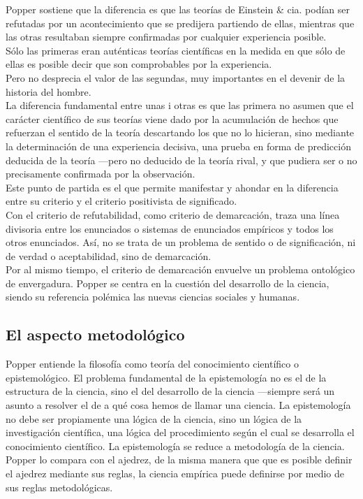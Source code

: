 \documentclass[a4paper, 11pt, twocolumn, spanish]{article}
\begin{document}
Popper sostiene que la diferencia es que las teorías de Einstein \&
cia. podían ser refutadas por un acontecimiento que se predijera
partiendo de ellas, mientras que las otras resultaban siempre
confirmadas por cualquier experiencia posible.\\[0pt]
Sólo las primeras eran auténticas teorías científicas en la medida en
que sólo de ellas es posible decir que son comprobables por la
experiencia.\\[0pt]
Pero no desprecia el valor de las segundas, muy importantes en el
devenir de la historia del hombre.\\[0pt]


La diferencia fundamental entre unas i otras es que las primera no
asumen que el carácter científico de sus teorías viene dado por la
acumulación de hechos que refuerzan el sentido de la teoría
descartando los que no lo hicieran, sino mediante la determinación de
una experiencia decisiva, una prueba en forma de predicción deducida
de la teoría —pero no deducido de la teoría rival, y que pudiera ser o
no precisamente confirmada por la observación.\\[0pt]

Este punto de partida es el que permite manifestar y ahondar en la
diferencia entre su criterio y el criterio positivista de
significado.\\[0pt]
Con el criterio de refutabilidad, como criterio de demarcación, traza
una línea divisoria entre los enunciados o sistemas de enunciados
empíricos y todos los otros enunciados. Así, no se trata de un
problema de sentido o de significación, ni de verdad o aceptabilidad,
sino de demarcación.\\[0pt]

Por al mismo tiempo, el criterio de demarcación envuelve un problema
ontológico de envergadura. Popper se centra en la cuestión del
desarrollo de la ciencia, siendo su referencia polémica las nuevas
ciencias sociales y humanas.

\subsection{El aspecto metodológico}
\label{sec:org549add2}
Popper entiende la filosofía como teoría del conocimiento científico o
epistemológico. El problema fundamental de la epistemología no es el
de la estructura de la ciencia, sino el del desarrollo de la ciencia
—siempre será un asunto a resolver el de a qué cosa hemos de llamar
una ciencia. La epistemología no debe ser propiamente una lógica de la
ciencia, sino un lógica de la investigación científica, una lógica del
procedimiento según el cual se desarrolla el conocimiento
científico. La epistemología se reduce a metodología de la ciencia.\\[0pt]
Popper lo compara con el ajedrez, de la misma manera que que es
posible definir el ajedrez mediante sus reglas, la ciencia empírica
puede definirse por medio de sus reglas metodológicas.\\[0pt]
\end{document}
